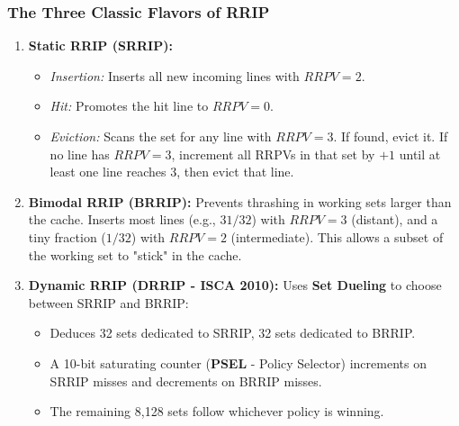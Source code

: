 \documentclass[11pt, a4paper]{article}
\begin{document}
\subsubsection{The Three Classic Flavors of RRIP}
\begin{enumerate}[leftmargin=1.5em]
  \item \textbf{Static RRIP (SRRIP):}
  \begin{itemize}
    \item \textit{Insertion:} Inserts all new incoming lines with $RRPV = 2$.
    \item \textit{Hit:} Promotes the hit line to $RRPV = 0$.
    \item \textit{Eviction:} Scans the set for any line with $RRPV = 3$. If found, evict it. If no line has $RRPV=3$, increment all RRPVs in that set by $+1$ until at least one line reaches 3, then evict that line.
  \end{itemize}

  \item \textbf{Bimodal RRIP (BRRIP):}
  Prevents thrashing in working sets larger than the cache. Inserts most lines (e.g., $31/32$) with $RRPV = 3$ (distant), and a tiny fraction ($1/32$) with $RRPV = 2$ (intermediate). This allows a subset of the working set to "stick" in the cache.

  \item \textbf{Dynamic RRIP (DRRIP - ISCA 2010):}
  Uses \textbf{Set Dueling} to choose between SRRIP and BRRIP:
  \begin{itemize}
    \item Deduces 32 sets dedicated to SRRIP, 32 sets dedicated to BRRIP.
    \item A 10-bit saturating counter (\textbf{PSEL} - Policy Selector) increments on SRRIP misses and decrements on BRRIP misses.
    \item The remaining 8,128 sets follow whichever policy is winning.
  \end{itemize}
\end{enumerate}
\end{document}
